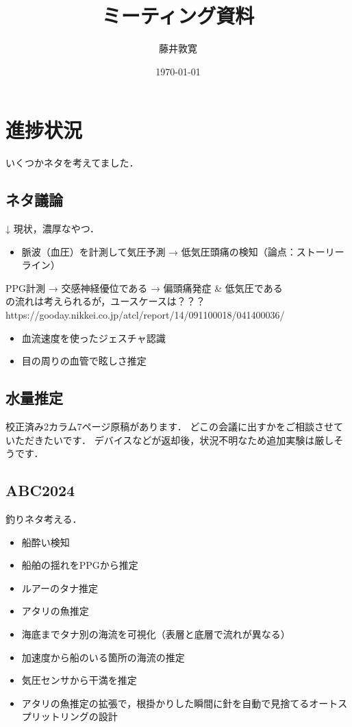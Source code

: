 \documentclass[a4j,10pt]{jarticle}
\title{ミーティング資料}
\author{藤井敦寛}
\date{\today}
\begin{document}
\maketitle

\section{進捗状況}
いくつかネタを考えてました．

\subsection{ネタ議論}
↓ 現状，濃厚なやつ．
\begin{itemize}
  \item 脈波（血圧）を計測して気圧予測 → 低気圧頭痛の検知（論点：ストーリーライン）
\end{itemize}
PPG計測 → 交感神経優位である → 偏頭痛発症 \& 低気圧である \\
の流れは考えられるが，ユースケースは？？？ \\
https://gooday.nikkei.co.jp/atcl/report/14/091100018/041400036/

\begin{itemize}
  \item 血流速度を使ったジェスチャ認識
  \item 目の周りの血管で眩しさ推定
\end{itemize}


\subsection{水量推定}
校正済み2カラム7ページ原稿があります．
どこの会議に出すかをご相談させていただきたいです．
デバイスなどが返却後，状況不明なため追加実験は厳しそうです．


\subsection{ABC2024}
釣りネタ考える．

\begin{multicols}{2}
  \begin{itemize}
    \item 船酔い検知
    \item 船舶の揺れをPPGから推定
    \item ルアーのタナ推定
    \item アタリの魚推定
    \item 海底までタナ別の海流を可視化（表層と底層で流れが異なる）
    \item 加速度から船のいる箇所の海流の推定
    \item 気圧センサから干満を推定
    \item アタリの魚推定の拡張で，根掛かりした瞬間に針を自動で見捨てるオートスプリットリングの設計
  \end{itemize}
\end{multicols}
\end{document}
